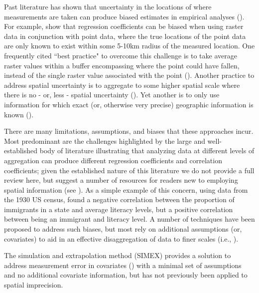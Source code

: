 Past literature has shown that uncertainty in the locations of where measurements are taken can produce biased estimates in empirical analyses (\cite{perez-heydrich_guidelines_2013,rettie_overcoming_1999}). 
For example, \cite{perez-heydrich_guidelines_2013} show that regression coefficients can be biased when using raster data in conjunction with point data, where the true locations of the point data are only known to exist within some 5-10km radius of the measured location. 
One frequently cited ``best practice" to overcome this challenge is to take average raster values within a buffer encompassing where the point could have fallen, instead of the single raster value associated with the point (\cite{perez-heydrich_guidelines_2013, rettie_overcoming_1999}). 
Another practice to address spatial uncertainty is to aggregate to some higher spatial scale where there is no - or, less - spatial uncertainty (\cite{runfola_using_2014,giner_creating_2014,perez-heydrich_guidelines_2013}). 
Yet another is to only use information for which exact (or, otherwise very precise) geographic information is known (\cite{runfola_migration_2016,dreher_aid_2015,runfola_what_2014}).
\par
There are many limitations, assumptions, and biases that these approaches incur.
Most predominant are the challenges highlighted by the large and well-established body of literature illustrating that analyzing data at different levels of aggregation can produce different regression coefficients and correlation coefficients; given the established nature of this literature we do not provide a full review here, but suggest a number of resources for readers new to employing spatial information (see \cite{clark_effects_1976, goodchild_models_2001, selvin_durkheims_1958, gotway_combining_2002, gehlke_certain_1934, cramer_efficient_1964}). 
As a simple example of this concern, using data from the 1930 US census, \cite{robinson_ecological_2009} found a negative correlation between the proportion of immigrants in a state and average literacy levels, but a positive correlation between being an immigrant and literacy level. 
A number of techniques have been proposed to address such biases, but most rely on additional assumptions (or, covariates) to aid in an effective disaggregation of data to finer scales (i.e., \cite{gotway_combining_2002, zhu_combined_2004,oloughlin_can_2000,wong_modifiable_2004}).
\par
The simulation and extrapolation method (SIMEX) provides a solution to address measurement error in covariates (\cite{wang_bias_1998,kuchenhoff_general_2006,li_functional_2003,cook_simulation-extrapolation_1994}) with a minimal set of assumptions and no additional covariate information, but has not previously been applied to spatial imprecision. 
